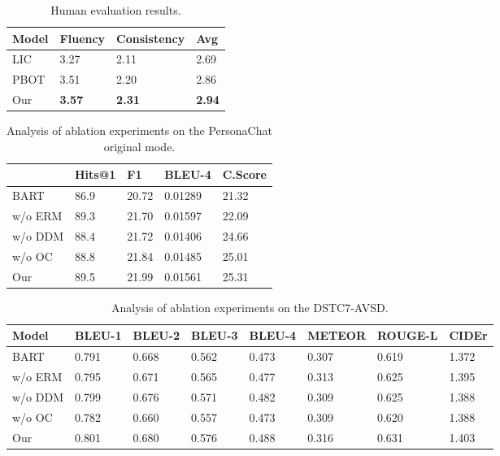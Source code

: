 \documentclass[letterpaper]{article} \usepackage{aaai23}  \usepackage{times}  \usepackage{helvet}  \usepackage{courier}  \usepackage[hyphens]{url}  \usepackage{graphicx} \urlstyle{rm} \def\UrlFont{\rm}  \usepackage{natbib}  \usepackage{caption} \frenchspacing  \setlength{\pdfpagewidth}{8.5in}  \setlength{\pdfpageheight}{11in}  \usepackage{algorithm}
\begin{document}
\begin{table}[t]
  \centering
    \begin{tabular}{llll}
    \toprule
    Model & \multicolumn{1}{p{4.19em}}{Fluency} & \multicolumn{1}{p{4.19em}}{Consistency} & \multicolumn{1}{p{4.19em}}{Avg} \\
    \midrule
    LIC   &  3.27  &  2.11 & 2.69 \\
PBOT &  3.51  &  2.20 &  2.86\\
Our   &  \textbf{3.57} &   \textbf{2.31} &  \textbf{2.94}\\
    \bottomrule
    \end{tabular}\caption{Human evaluation results.}
\label{table5}\end{table}\begin{table}[t]
  \centering
    \begin{tabular}{lllll}
    \toprule
    \multicolumn{1}{l}{} & \multicolumn{1}{l}{Hits@1} & \multicolumn{1}{l}{F1} & \multicolumn{1}{l}{BLEU-4} & \multicolumn{1}{l}{C.Score} \\
    \midrule
    BART  & 86.9  & 20.72 & 0.01289 &  21.32\\
w/o ERM & 89.3  & 21.70  & 0.01597 & 22.09 \\
w/o DDM & 88.4  & 21.72 & 0.01406 &  24.66\\
w/o OC & 88.8  & 21.84 & 0.01485 &  25.01\\
Our   & 89.5  & 21.99 & 0.01561 &  25.31\\
    \bottomrule
    \end{tabular}\caption{Analysis of ablation experiments on the PersonaChat original mode.}
\label{table6}\end{table}\begin{table*}[t]
  \centering
    \begin{tabular}{llllllll}
    \toprule
    Model & \multicolumn{1}{p{4.19em}}{BLEU-1} & \multicolumn{1}{p{4.19em}}{BLEU-2} & \multicolumn{1}{p{4.19em}}{BLEU-3} & \multicolumn{1}{p{4.19em}}{BLEU-4} & \multicolumn{1}{p{4.19em}}{METEOR} & \multicolumn{1}{p{4.49em}}{ROUGE-L} & \multicolumn{1}{p{4.19em}}{CIDEr} \\
    \midrule
    BART  &  0.791 &  0.668 &  0.562 & 0.473  & 0.307  & 0.619  & 1.372 \\
w/o ERM & 0.795  & 0.671  & 0.565  & 0.477  &  0.313 & 0.625  & 1.395 \\
w/o DDM & 0.799  &  0.676 & 0.571  & 0.482  &  0.309 &  0.625 & 1.388 \\
w/o OC & 0.782 & 0.660 & 0.557 & 0.473 & 0.309 & 0.620 & 1.388 \\
Our   & 0.801 & 0.680  & 0.576 & 0.488 & 0.316 & 0.631 & 1.403 \\
    \bottomrule
    \end{tabular}
\caption{Analysis of ablation experiments on the DSTC7-AVSD.}   
\label{table7}
\end{table*}
\end{document}
